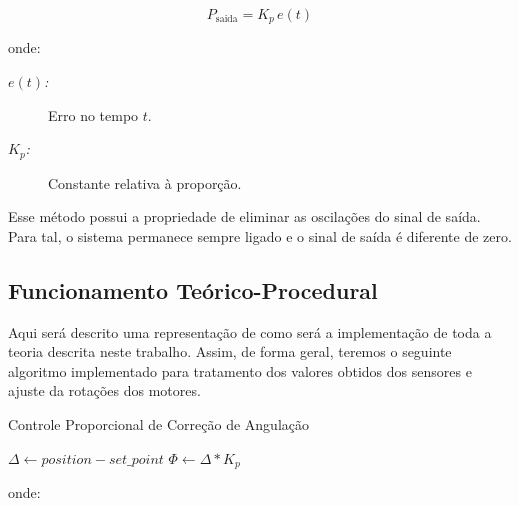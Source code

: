 \documentclass[portugues, brazil, a4paper,12pt]{article}
\begin{document}
		\begin{equation}
		P_{\mathrm {saida} }=K_{p}\,{e(t)}
		\end{equation}

		onde:

		\begin{description}
			\item[$ e(t) $\textit{:}] Erro no tempo $ t $.
			\item[$ K_p $\textit{:}] Constante relativa à proporção.
		\end{description}

		Esse método possui a propriedade de eliminar as oscilações do sinal de saída. Para tal, o sistema permanece sempre ligado e o sinal de saída é diferente de zero.


	\subsection{Funcionamento Teórico-Procedural}
		Aqui será descrito uma representação de como será a implementação de toda a teoria descrita neste trabalho. Assim, de forma geral, teremos o seguinte algoritmo implementado para tratamento dos valores obtidos dos sensores e ajuste da rotações dos motores.

		\begin{algorithm}[H]
			\caption{Controle Proporcional de Correção de Angulação}\label{euclid}
			\begin{algorithmic}[1]

				\State $ \Delta \gets position - set\_point $
				\State $ \Phi \gets \Delta * K_p $
				\EndProcedure
			\end{algorithmic}
		\end{algorithm}

		onde:
\end{document}
